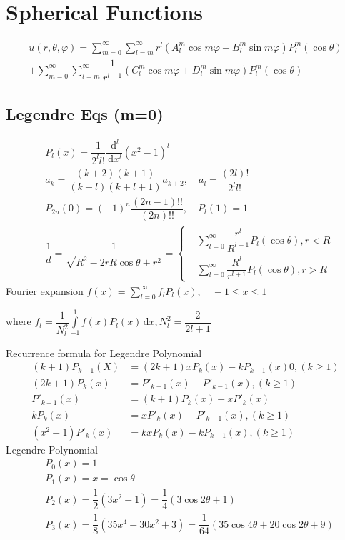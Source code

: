 \documentclass[10pt, a4paper, twocolumn]{article}
\def\d{\,\mathrm{d}}
\def\phi{\varphi}
\begin{document}
\section{Spherical Functions}
	\begin{align*}
		u(r,\theta,\phi) = \sum_{m=0}^\infty\sum_{l=m}^\infty r^l(A^m_l\cos m\phi + B^m_l\sin m\phi)P^m_l(\cos\theta)\\
		+ \sum_{m=0}^\infty\sum_{l=m}^\infty \dfrac{1}{r^{l+1}}(C^m_l\cos m\phi + D^m_l\sin m\phi)P^m_l(\cos\theta)
	\end{align*}

\subsection{Legendre Eqs (m=0)}
	\begin{align*}
		&P_l(x) = \dfrac{1}{2^ll!}\dfrac{\d^l}{\d x^l}(x^2-1)^l\\
		&a_k = \dfrac{(k+2)(k+1)}{(k-l)(k+l+1)}a_{k+2}, \quad a_l = \dfrac{(2l)!}{2^ll!}\\
		&P_{2n}(0) = (-1)^n \dfrac{(2n-1)!!}{(2n)!!}, \quad P_l(1) = 1\\
		&\dfrac{1}{d} = \dfrac{1}{\sqrt{R^2 - 2rR\cos\theta + r^2}}
			=\left\{\begin{aligned}
				&\sum^\infty_{l=0}\dfrac{r^l}{R^{l+1}}P_l(\cos\theta), r<R\\
				&\sum^\infty_{l=0}\dfrac{R^l}{r^{l+1}}P_l(\cos\theta), r>R
			\end{aligned}\right.
	\end{align*}
	Fourier expansion $f(x) = \displaystyle\sum^\infty_{l=0}f_lP_l(x), \quad -1 \leq x \leq 1$
	
	where $f_l = \dfrac{1}{N_l^2}\displaystyle\int \limits^1_{-1}f(x)P_l(x)\d x, N_l^2 = \dfrac{2}{2l+1}$
	
	Recurrence formula for Legendre Polynomial
	\begin{align*}
		(k+1)P_{k+1}(X) &= (2k+1)xP_k(x) - kP_{k-1}(x) 0, (k\geq 1)\\
		(2k+1)P_k(x) &= P'_{k+1}(x) - P'_{k-1}(x), (k\geq 1)\\
		P'_{k+1}(x) &= (k+1)P_k(x) + xP'_k(x)\\
		kP_k(x) &= xP'_k(x) - P'_{k-1}(x), (k\geq 1)\\
		(x^2 -1)P'_k(x) &= kxP_k(x) - kP_{k-1}(x), (k\geq 1)
	\end{align*}
	Legendre Polynomial
	\begin{align*}
		&P_0(x) = 1\\
		&P_1(x) = x = \cos\theta\\
		&P_2(x) = \dfrac{1}{2}(3x^2 - 1) = \dfrac{1}{4}(3\cos2\theta + 1)\\
		&P_3(x) = \dfrac{1}{8}(35x^4 - 30x^2 + 3)
				= \dfrac{1}{64}(35\cos4\theta + 20\cos2\theta + 9)
	\end{align*}
	
\end{document}

